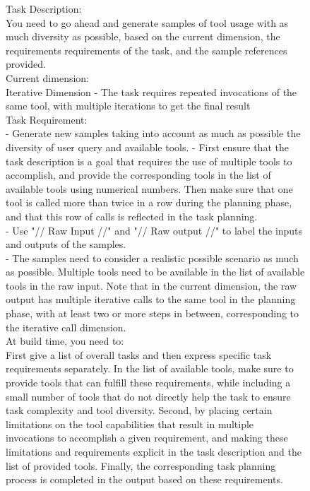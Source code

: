 \begin{figure}[!htb]
\small
\begin{tcolorbox}[
    colback=white, 
    colframe=blue3, 
    boxrule=0.5mm,
    arc=0mm,
    outer arc=0mm,
    title=Limited Functionality Tools: Iterative - Generation Prompt
]
Task Description:\\
You need to go ahead and generate samples of tool usage with as much diversity as possible, based on the current dimension, the requirements requirements of the task, and the sample references provided.\\

Current dimension:\\
Iterative Dimension - The task requires repeated invocations of the same tool, with multiple iterations to get the final result\\

Task Requirement:\\
- Generate new samples taking into account as much as possible the diversity of user query and available tools.
- First ensure that the task description is a goal that requires the use of multiple tools to accomplish, and provide the corresponding tools in the list of available tools using numerical numbers. Then make sure that one tool is called more than twice in a row during the planning phase, and that this row of calls is reflected in the task planning.\\
- Use "// Raw Input //" and "// Raw output //" to label the inputs and outputs of the samples.\\
- The samples need to consider a realistic possible scenario as much as possible. Multiple tools need to be available in the list of available tools in the raw input. Note that in the current dimension, the raw output has multiple iterative calls to the same tool in the planning phase, with at least two or more steps in between, corresponding to the iterative call dimension.\\

At build time, you need to:\\
First give a list of overall tasks and then express specific task requirements separately. In the list of available tools, make sure to provide tools that can fulfill these requirements, while including a small number of tools that do not directly help the task to ensure task complexity and tool diversity. Second, by placing certain limitations on the tool capabilities that result in multiple invocations to accomplish a given requirement, and making these limitations and requirements explicit in the task description and the list of provided tools. Finally, the corresponding task planning process is completed in the output based on these requirements.\\


\end{tcolorbox}
\end{figure}
